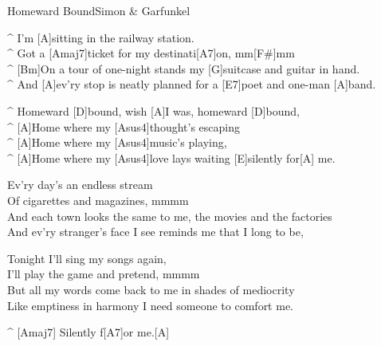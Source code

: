 \begin{song}{Homeward Bound}{Simon \& Garfunkel}
\begin{guitar}
^ I'm [A]sitting in the railway station.\\
^ Got a [Amaj7]ticket for my destinati[A7]on, mm[F#]mm\\
^ [Bm]On a tour of one-night stands my [G]suitcase and guitar in hand.\\
^ And [A]ev'ry stop is neatly planned for a [E7]poet and one-man [A]band.\\
\end{guitar}


\begin{guitar}
^ Homeward [D]bound,  wish [A]I was, homeward [D]bound,\\
^ [A]Home where my [Asus4]thought's escaping\\
^ [A]Home where my [Asus4]music's playing,\\
^ [A]Home where my [Asus4]love lays waiting [E]silently for[A] me.\\
\end{guitar}


\begin{guitar}
Ev'ry day's an endless stream\\
Of cigarettes and magazines, mmmm\\
And each town looks the same to me, the movies and the factories\\
And ev'ry stranger's face I see reminds me that I long to be,\\
\end{guitar}



\begin{guitar}
Tonight I'll sing my songs again,\\
I'll play the game and pretend, mmmm\\
But all my words come back to me in shades of mediocrity\\
Like emptiness in harmony I need someone to comfort me.\\
\end{guitar}

\begin{guitar}
^ [Amaj7]  Silently f[A7]or me.[A]\\
\end{guitar}
\end{song}
\vspace{-0.5cm}
